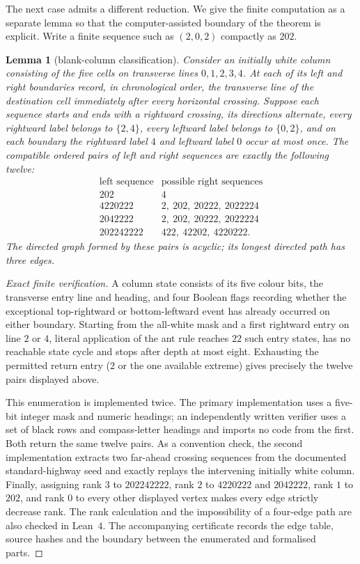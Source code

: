\documentclass[11pt,letterpaper]{article}
\theoremstyle{plain}
\newtheorem{lemma}[theorem]{Lemma}
\theoremstyle{definition}
\begin{document}
\begin{NoHyper}
The next case admits a different reduction.  We give the finite computation as a
separate lemma so that the computer-assisted boundary of the theorem is explicit.
Write a finite sequence such as $(2,0,2)$ compactly as $202$.

\begin{lemma}[blank-column classification]\label{lem:blankcolumn}
Consider an initially white column consisting of the five cells on transverse
lines $0,1,2,3,4$.  At each of its left and right boundaries record, in chronological
order, the transverse line of the destination cell immediately after every horizontal
crossing.  Suppose each sequence starts and ends with a rightward crossing, its
directions alternate, every rightward label belongs to $\{2,4\}$, every leftward
label belongs to $\{0,2\}$, and on each boundary the rightward label $4$ and
leftward label $0$ occur at most once.  The compatible ordered pairs of left and
right sequences are exactly the following twelve:
\[
\begin{array}{c|l}
\text{left sequence}&\text{possible right sequences}\\ \hline
202&4\\
4220222&2,\ 202,\ 20222,\ 2022224\\
2042222&2,\ 202,\ 20222,\ 2022224\\
202242222&422,\ 42202,\ 4220222.
\end{array}
\]
The directed graph formed by these pairs is acyclic; its longest directed path has
three edges.
\end{lemma}

\begin{proof}[Exact finite verification]
A column state consists of its five colour bits, the transverse entry line and
heading, and four Boolean flags recording whether the exceptional top-rightward or
bottom-leftward event has already occurred on either boundary.  Starting from the
all-white mask and a first rightward entry on line $2$ or $4$, literal application of
the ant rule reaches $22$ such entry states, has no reachable state cycle and stops
after depth at most eight.  Exhausting the permitted return entry ($2$ or the one
available extreme) gives precisely the twelve pairs displayed above.

This enumeration is implemented twice.  The primary implementation uses a five-bit
integer mask and numeric headings; an independently written verifier uses a set of
black rows and compass-letter headings and imports no code from the first.  Both
return the same twelve pairs.  As a convention check, the second implementation
extracts two far-ahead crossing sequences from the documented standard-highway seed
and exactly replays the intervening initially white column.  Finally, assigning rank
$3$ to $202242222$, rank $2$ to $4220222$ and $2042222$, rank $1$ to $202$, and
rank $0$ to every other displayed vertex makes every edge strictly decrease rank.
The rank calculation and the impossibility of a four-edge path are also checked in
Lean~$4$.  The accompanying certificate records the edge table, source hashes and
the boundary between the enumerated and formalised parts.
\end{proof}


\end{NoHyper}
\end{document}
